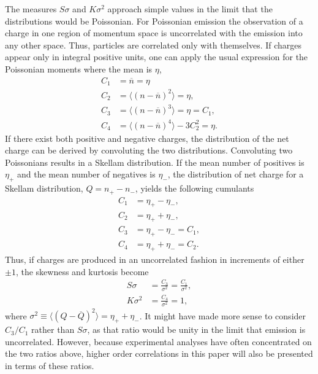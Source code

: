 The measures $S\sigma$ and $K\sigma^2$ approach simple values in the limit that the distributions would be Poissonian. For Poissonian emission the observation of a charge in one region of momentum space is uncorrelated with the emission into any other space. Thus, particles are correlated only with themselves. If charges appear only in integral positive units, one can apply the usual expression for the Poissonian moments where the mean is $\eta$, 
\begin{eqnarray}
C_1&=\overline{n}=\eta\\
C_2&=\langle(n-\overline{n})^2\rangle=\eta,\\
C_3&=\langle(n-\overline{n})^3\rangle=\eta=C_1,\\
C_4&=\langle(n-\overline{n})^4\rangle-3C_2^2=\eta.
\end{eqnarray}
If there exist both positive and negative charges, the distribution of the net charge can be derived by convoluting the two distributions. Convoluting two Poissonians results in a Skellam distribution. If the mean number of positives is $\eta_+$ and the mean number of negatives is $\eta_-$, the distribution of net charge for a Skellam distribution, $Q=n_+-n_-$, yields the following cumulants
\begin{eqnarray}
C_1&=\eta_+-\eta_-,\\
C_2&=\eta_++\eta_-,\\
C_3&=\eta_+-\eta_-=C_1,\\
C_4&=\eta_++\eta_-=C_2.
\end{eqnarray}
Thus, if charges are produced in an uncorrelated fashion in increments of either $\pm 1$, the skewness and kurtosis become
\begin{eqnarray}
S\sigma&=\frac{C_3}{\sigma^2}=\frac{C_1}{\sigma^2},\\
K\sigma^2&=\frac{C_4}{\sigma^2}=1,
\end{eqnarray}
where $\sigma^2\equiv\langle(Q-\overline{Q})^2\rangle=\eta_++\eta_-$. It might have made more sense to consider $C_3/C_1$ rather than $S\sigma$, as that ratio would be unity in the limit that emission is uncorrelated. However, because experimental analyses have often concentrated on the two ratios above, higher order correlations in this paper will also be presented in terms of these ratios.

